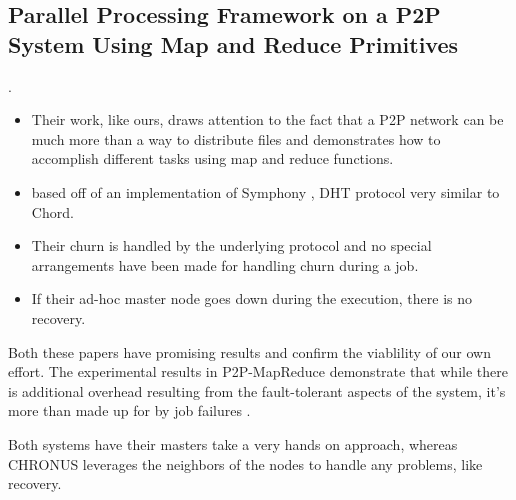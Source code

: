 \documentclass[conference, compsocconf, letterpaper]{IEEEtran}
\begin{document}
\subsection{Parallel Processing Framework on a P2P System Using Map and Reduce Primitives} \cite{leemap}. 
\begin{itemize}
    \item Their work, like ours, draws attention to the fact that a P2P network can be much more than a way to distribute files and demonstrates how to accomplish different tasks using map and reduce functions. 
    \item based off of an implementation of Symphony \cite{symphony}, DHT protocol very similar to Chord.
    \item Their churn is handled by the underlying protocol and no special arrangements have been made for handling churn during a job.
    \item If their ad-hoc master node goes down during the execution, there is no recovery.
\end{itemize}




Both these papers have promising results and confirm the viablility of our own effort.  The experimental results in P2P-MapReduce demonstrate that while there is additional overhead resulting from the fault-tolerant aspects of the system, it's more than made up for by job failures \cite{marozzo2012p2p}.

Both systems have their masters take a very hands on approach, whereas CHRONUS leverages the neighbors of the nodes to handle any problems, like recovery. 


\end{document}
